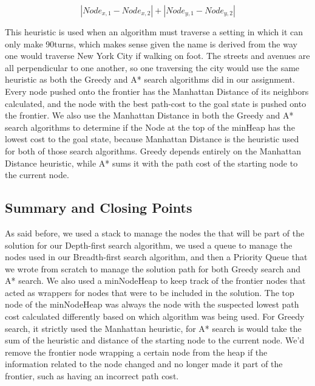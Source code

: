 \documentclass[titlepage]{article}
\begin{document}
\[ |Node_{x, 1} - Node_{x, 2}| + |Node_{y, 1} - Node_{y, 2}|   \]

\noindent
This heuristic is used when an algorithm must traverse a setting in which it can only make 90\degree turns, which makes sense given the name is derived from the way one would traverse New York City if walking on foot. The streets and avenues are all perpendicular to one another, so one traversing the city would use the same heuristic as both the Greedy and A* search algorithms did in our assignment. Every node pushed onto the frontier has the Manhattan Distance of its neighbors calculated, and the node with the best path-cost to the goal state is pushed onto the frontier. We also use the Manhattan Distance in both the Greedy and A* search algorithms to determine if the Node at the top of the minHeap has the lowest cost to the goal state, because Manhattan Distance is the heuristic used for both of those search algorithms. Greedy depends entirely on the Manhattan Distance heuristic, while A* sums it with the path cost of the starting node to the current node.

\subsection{Summary and Closing Points}
As said before, we used a stack to manage the nodes the that will be part of the solution for our Depth-first search algorithm, we used a queue to manage the nodes used in our Breadth-first search algorithm, and then a Priority Queue that we wrote from scratch to manage the solution path for both Greedy search and A* search. We also used a minNodeHeap to keep track of the frontier nodes that acted as wrappers for nodes that were to be included in the solution. The top node of the minNodeHeap was always the node with the suspected lowest path cost calculated differently based on which algorithm was being used. For Greedy search, it strictly used the Manhattan heuristic, for A* search is would take the sum of the heuristic and distance of the starting node to the current node. We'd remove the frontier node wrapping a certain node from the heap if the information related to the node changed and no longer made it part of the frontier, such as having an incorrect path cost. 

\newpage
\end{document}
